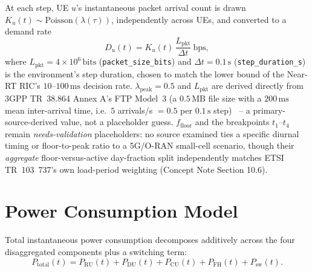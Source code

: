 At each step, UE $u$'s instantaneous packet arrival count is drawn
$K_u(t) \sim \mathrm{Poisson}(\lambda(\tau))$, independently across UEs, and
converted to a demand rate
\begin{equation}
  D_u(t) = K_u(t)\, \frac{L_{\mathrm{pkt}}}{\Delta t}\ \text{bps},
  \label{eq:oran-demand}
\end{equation}
where $L_{\mathrm{pkt}} = 4\times10^{6}\,\mathrm{bits}$
(\texttt{packet\_size\_bits}) and $\Delta t = 0.1\,\mathrm{s}$
(\texttt{step\_duration\_s}) is the environment's step duration, chosen to
match the lower bound of the Near-RT RIC's $10$--$100\,\mathrm{ms}$ decision
rate. $\lambda_{\mathrm{peak}}=0.5$ and $L_{\mathrm{pkt}}$ are derived
directly from 3GPP TR~38.864 Annex A's FTP Model~3 (a $0.5\,\mathrm{MB}$
file size with a $200\,\mathrm{ms}$ mean inter-arrival time, i.e.\ $5$
arrivals/s $=0.5$ per $0.1\,\mathrm{s}$ step)~\cite{threegpp38864} -- a
primary-source-derived value, not a placeholder guess. $f_{\mathrm{floor}}$
and the breakpoints $t_1$--$t_4$ remain \emph{needs-validation}
placeholders: no source examined ties a specific diurnal timing or
floor-to-peak ratio to a 5G/O-RAN small-cell scenario, though their
\emph{aggregate} floor-versus-active day-fraction split independently
matches ETSI TR~103~737's own load-period weighting (Concept Note Section
10.6).

\section{Power Consumption Model}
\label{sec:oran-power}

Total instantaneous power consumption decomposes additively across the
four disaggregated components plus a switching term:
\begin{equation}
  P_{\mathrm{total}}(t) = P_{\mathrm{RU}}(t) + P_{\mathrm{DU}}(t) + P_{\mathrm{CU}}(t) + P_{\mathrm{FH}}(t) + P_{\mathrm{sw}}(t).
  \label{eq:oran-total-power}
\end{equation}

